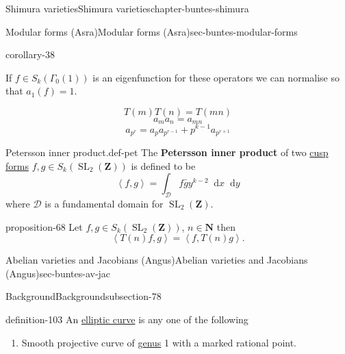 \documentclass[oneside,10pt,]{book}
\newcommand{\terminology}[1]{\textbf{#1}}
\numberwithin{equation}{section}
\newcommand{\diff}{\mathop{}\!\mathrm{d}}
\newcommand{\pair}[2]{\left\langle #1, #2 \right\rangle}
\newcommand{\NN}{\mathbf{N}}
\newcommand{\ZZ}{\mathbf{Z}}
\DeclareMathOperator{\SL}{SL}
\begin{document}
\begin{chapterptx}{Shimura varieties}{}{Shimura varieties}{}{}{chapter-buntes-shimura}
\begin{sectionptx}{Modular forms (Asra)}{}{Modular forms (Asra)}{}{}{sec-buntes-modular-forms}
\begin{corollary}{}{}{corollary-38}
%
\end{corollary}
\hypertarget{p-1085}{}%
If \(f\in S_k(\Gamma_0(1))\) is an eigenfunction for these operators we can normalise so that \(a_1(f) = 1\).%
\par
\hypertarget{p-1086}{}%
%
\begin{equation*}
T(m)T(n) = T(mn)
\end{equation*}
%
\begin{equation*}
a_ma_n = a_{mn}
\end{equation*}
%
\begin{equation*}
a_{p^r} = a_p a_{p^{r-1}} + p^{k-1} a_{p^{r+1}}
\end{equation*}
%
\begin{definition}{Petersson inner product.}{def-pet}%
\hypertarget{p-1087}{}%
The \terminology{Petersson inner product} of two \hyperref[def-buntes-cusp-forms]{cusp forms} \(f,g\in S_k(\SL_2(\ZZ))\) is defined to be%
\begin{equation*}
\pair{f}{g} = \int_{\mathcal D} f \bar g y^{k-2} \diff x \diff y
\end{equation*}
where \(\mathcal D\) is a fundamental domain for \(\SL_2(\ZZ)\).%
\end{definition}
\begin{proposition}{}{}{proposition-68}%
\hypertarget{p-1088}{}%
Let \(f,g\in S_k(\SL_2(\ZZ))\), \(n\in \NN\) then%
\begin{equation*}
\pair{T(n) f}{g} = \pair{f}{T(n)g}\text{.}
\end{equation*}
%
\end{proposition}
\end{sectionptx}
%
%
\typeout{************************************************}
\typeout{************************************************}
%
\begin{sectionptx}{Abelian varieties and Jacobians (Angus)}{}{Abelian varieties and Jacobians (Angus)}{}{}{sec-buntes-av-jac}
%
%
\typeout{************************************************}
\typeout{************************************************}
%
\begin{subsectionptx}{Background}{}{Background}{}{}{subsection-78}
\begin{definition}{}{definition-103}%
\hypertarget{p-1089}{}%
An \hyperref[def-supersing-isog-ec]{elliptic curve} is any one of the following\leavevmode%
\begin{enumerate}
\item\hypertarget{li-275}{}Smooth projective curve of \hyperref[def-class-set]{genus} 1 with  a marked rational point.%

\end{enumerate}
\end{definition}
\end{subsectionptx}
\end{sectionptx}
\end{chapterptx}
\end{document}
